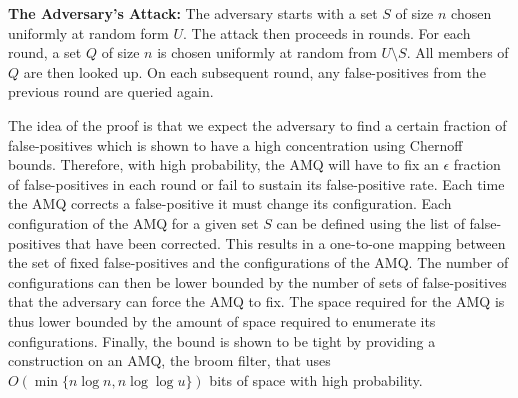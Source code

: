 \documentclass[../paper.tex]{subfiles}
\begin{document}
	{\bf The Adversary's Attack:} The adversary starts with a set $S$ of size $n$ chosen
	uniformly at random form $U$.  The attack then proceeds in rounds.  For each round, 
	a set $Q$ of size $n$ is chosen uniformly at random from $U\setminus S$.  All members
	of $Q$ are then looked up. On each subsequent round, any false-positives from the 
	previous round are queried again. 
	
	The idea of the proof is that we expect the adversary to find a certain 
	fraction of false-positives which is shown to have a high concentration using Chernoff
	bounds.  Therefore, with high probability, the AMQ will have to fix an $\epsilon$ fraction
	of false-positives in each round or fail to sustain its false-positive rate.  Each time the 
	AMQ corrects a false-positive it must change its configuration.  Each configuration of the 
	AMQ for a given set $S$ can be defined using the list of false-positives that have been
	corrected.  This results in a one-to-one mapping between the set of fixed false-positives 
	and the configurations of the AMQ.  The number of configurations can then be lower 
	bounded by the number of sets of false-positives that the adversary can force the AMQ
	to fix.  The space required for the AMQ is thus lower bounded by the amount of space 
	required to enumerate its configurations.  Finally, the bound is shown to be tight by 
	providing a construction on an AMQ, the broom filter, that uses $O(\min \{n\log n, 
	n\log\log u\})$ bits of space with high probability. 
\end{document}
